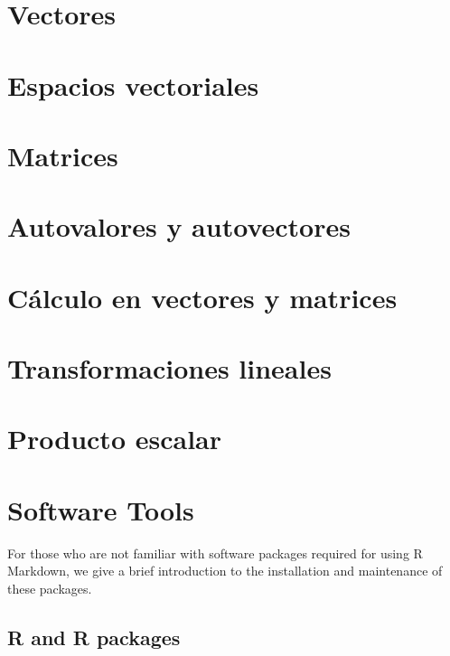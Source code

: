 \documentclass[12pt,]{krantz}
\theoremstyle{definition}
\theoremstyle{definition}
\theoremstyle{definition}
\theoremstyle{remark}
\begin{document}
\chapter{Vectores}\label{vectores}

\chapter{Espacios vectoriales}\label{espacios-vectoriales}

\chapter{Matrices}\label{matrices}

\chapter{Autovalores y autovectores}\label{autovalores-y-autovectores}

\chapter{Cálculo en vectores y
matrices}\label{calculo-en-vectores-y-matrices}

\chapter{Transformaciones lineales}\label{transformaciones-lineales}

\chapter{Producto escalar}\label{producto-escalar}

\cleardoublepage 

\appendix {}


\chapter{Software Tools}\label{software-tools}

For those who are not familiar with software packages required for using
R Markdown, we give a brief introduction to the installation and
maintenance of these packages.

\section{R and R packages}\label{r-and-r-packages}
\end{document}

